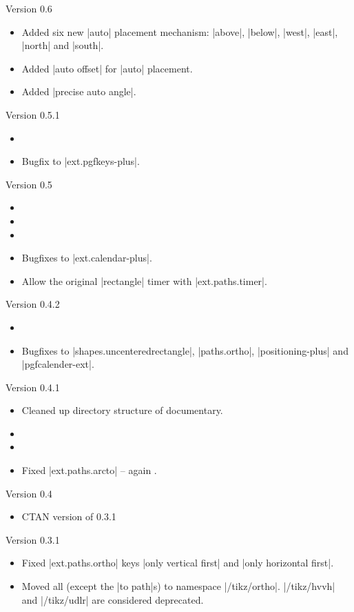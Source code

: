 \begin{multicols}{2}\raggedright
\noindent
Version 0.6
\begin{itemize}
\item Added six new |auto| placement mechanism: |above|, |below|, |west|, |east|, |north| and |south|.
\item Added |auto offset| for |auto| placement.
\item Added |precise auto angle|.
\end{itemize}
Version 0.5.1
\begin{itemize}
\item {}
\item Bugfix to |ext.pgfkeys-plus|. \cite{GH6}
\end{itemize}
Version 0.5
\begin{itemize}
\item {}
\item {}
\item {}
\item Bugfixes to |ext.calendar-plus|.
\item Allow the original |rectangle| timer with |ext.paths.timer|.
\end{itemize}
Version 0.4.2
\begin{itemize}
\item {}
\item Bugfixes to |shapes.uncenteredrectangle|, |paths.ortho|, |positioning-plus| and |pgfcalender-ext|.
\end{itemize}
Version 0.4.1
\begin{itemize}
\item Cleaned up directory structure of documentary.
\item {}
\item {}
\item Fixed |ext.paths.arcto| -- again \cite{GH2}.
\end{itemize}
Version 0.4
\begin{itemize}
\item CTAN version of 0.3.1
\end{itemize}
Version 0.3.1
\begin{itemize}
\item Fixed |ext.paths.ortho| keys |only vertical first| and |only horizontal first|.
\item Moved all (except the |to path|s) to namespace |/tikz/ortho|.
     |/tikz/hvvh| and |/tikz/udlr| are considered deprecated.

\end{itemize}
\end{multicols}
